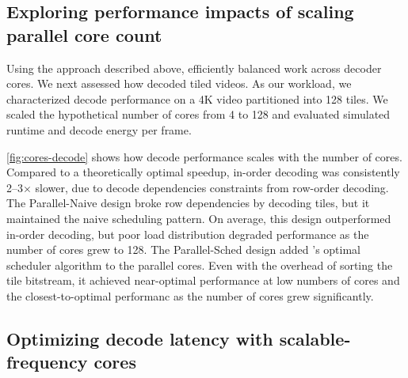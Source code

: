 \subsection{Exploring performance impacts of scaling parallel core count}
\label{subsec:parallel-design-space}
Using the approach described above, \nameArch efficiently balanced work across decoder cores.  We next assessed how \nameArch decoded tiled videos.
As our workload, we characterized decode performance on a 4K video partitioned into 128 tiles.
We scaled the hypothetical number of cores from 4 to 128 and evaluated simulated runtime and decode energy per frame.


\ref{fig:cores-decode} shows how decode performance scales with the number of cores.
Compared to a theoretically optimal speedup, in-order decoding was consistently 2--3$\times$ slower, due to decode dependencies constraints from row-order decoding.
The Parallel-Naive design broke row dependencies by decoding tiles, but it maintained the naive scheduling pattern.
On average, this design outperformed in-order decoding, but poor load distribution degraded performance as the number of cores grew to 128.
The Parallel-Sched design added \nameArch's optimal scheduler algorithm to the parallel cores.
Even with the overhead of sorting the tile bitstream, it achieved near-optimal performance at low numbers of cores and the closest-to-optimal performanc as the number of cores grew significantly.

\dvfsEnergySpeedup

\subsection{Optimizing decode latency with scalable-frequency cores}
\label{subsec:hetero-cores}

